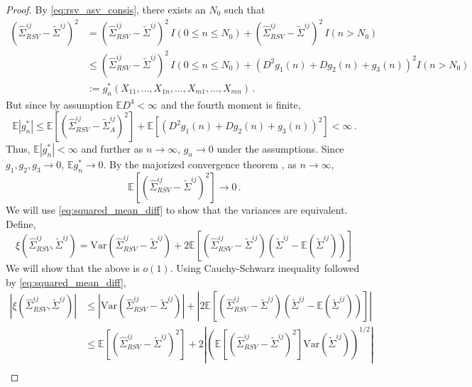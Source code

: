 \documentclass[12pt]{article}
\newcommand{\E}{\mathbb{E}}
\newcommand{\Var}{\text{Var}}
\theoremstyle{remark}
\begin{document}
\begin{proof}
By \eqref{eq:rsv_asv_consis}, there exists an $N_0$ such that
\begin{align*}
\left(\hat{\Sigma}_{RSV}^{ij} - \tilde{\Sigma}^{ij} \right)^2 &= \left(\hat{\Sigma}_{RSV}^{ij} - \tilde{\Sigma}^{ij} \right)^2 \, I(0 \leq n \leq N_0) + \left(\hat{\Sigma}_{RSV}^{ij} - \tilde{\Sigma}^{ij} \right)^2 \, I(n > N_0)\\
& \leq \left(\hat{\Sigma}_{RSV}^{ij} - \tilde{\Sigma}^{ij} \right)^2 \, I(0 \leq n \leq N_0) +  \left(D^2g_1(n) + Dg_2(n) + g_3(n) \right)^2 I(n > N_0)\\
& := g_n^*(X_{11}, \dots, X_{1n}, \dots, X_{m1}, \dots, X_{mn})\,.
\end{align*}
But since by assumption $\E D^4 <\infty$ and the fourth moment is finite,
\[
\E \left| g_n^* \right| \leq  \E \left[\left(\hat{\Sigma}_{RSV}^{ij} - \tilde{\Sigma}_{A}^{ij} \right)^2 \right] + \E \left[\left(D^2g_1(n) + Dg_2(n) + g_3(n) \right)^2 \right] < \infty\,.
\]
Thus, $\E \left| g_n^* \right| < \infty$ and further as $n \to \infty$, $g_n \to 0$ under the assumptions. Since $g_1, g_2, g_3 \to 0$, $\E g_n^* \to 0$. By the majorized convergence theorem \citep{zeid:2013}, as $n \to \infty$,
\begin{equation}
\label{eq:squared_mean_diff}
  \E \left[\left(\hat{\Sigma}_{RSV}^{ij} - \tilde{\Sigma}^{ij} \right)^2 \right] \to 0\,.
\end{equation}
%
We will use \eqref{eq:squared_mean_diff} to show that the variances are equivalent. Define,
\[
\xi\left(\hat{\Sigma}_{RSV}^{ij}, \tilde{\Sigma}^{ij} \right) = \Var\left(\hat{\Sigma}_{RSV}^{ij} - \tilde{\Sigma}^{ij} \right) + 2 \E\left[ \left(\hat{\Sigma}_{RSV}^{ij} -  \tilde{\Sigma}^{ij} \right) \left(\tilde{\Sigma}^{ij}  - \E \left( \tilde{\Sigma}^{ij} \right) \right) \right]
\]
We will show that the above is $o(1)$. Using Cauchy-Schwarz inequality followed by \eqref{eq:squared_mean_diff},
\begin{align*}
\left|  \xi\left(\hat{\Sigma}_{RSV}^{ij}, \tilde{\Sigma}^{ij} \right) \right| & \leq \left| \Var\left(\hat{\Sigma}_{RSV}^{ij} -  \tilde{\Sigma}^{ij} \right) \right| + \left| 2 \E\left[ \left(\hat{\Sigma}_{RSV}^{ij} - \tilde{\Sigma}^{ij} \right) \left(\tilde{\Sigma}^{ij}  - \E \left( \tilde{\Sigma}^{ij} \right) \right) \right]\right| \\ 
& \leq \E\left[\left(\hat{\Sigma}_{RSV}^{ij} -  \tilde{\Sigma}^{ij} \right)^2 \right] + 2 \left| \left(\E\left[ \left(\hat{\Sigma}_{RSV}^{ij} - \tilde{\Sigma}^{ij} \right)^2 \right]  \Var\left(\tilde{\Sigma}^{ij}  \right)   \right)^{1/2}\right| \\ 

\end{align*}
\end{proof}
\end{document}
